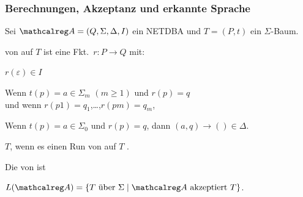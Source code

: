     \begin{frame}
      \frametitle{Berechnungen, Akzeptanz und erkannte Sprache}
      \begin{Definition}
        Sei $\Aut{A} = (Q,\Sigma,\Delta,I)$ ein NETDBA und $T=(P,t)$ ein $\Sigma$-Baum.
        \begin{Itemize}
          \item
             von  auf $T$
            ist eine Fkt.\ $r : P \to Q$ mit:
            \begin{Itemize}
              \item
                $r(\varepsilon) \in I$
              \item<2->
                Wenn $t(p) = a \in \Sigma_m$ $(m \geqslant 1)$ und $r(p) = q$ \\
                und wenn $r(p1) = q_1$,\quad \dots,\quad $r(pm) = q_m$,
                \par\smallskip
              \item<4->
                Wenn $t(p) = a \in \Sigma_0$ und $r(p) = q$, dann $(a,q) \to () \in \Delta$.
            \end{Itemize}
          \item<5->
              $T$, wenn es einen Run von  auf $T$ .
          \item<6->
            Die von   ist
            \par
            $L(\Aut{A}) = \{T \text{~über~} \Sigma \mid \Aut{A} \text{~akzeptiert~} T\}$.
        \end{Itemize}
      \end{Definition}

      \par\bigskip

    \end{frame}

